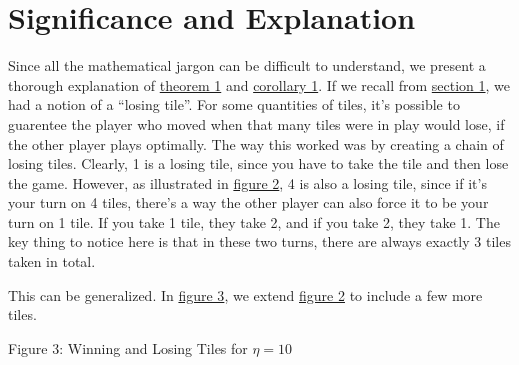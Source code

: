 \documentclass[11pt, letterpaper]{article}
\begin{document}
\section{Significance and Explanation}
\label{sec:3}
Since all the mathematical jargon can be difficult to understand, we present a thorough explanation of \hyperref[lma:1]{theorem 1} and \hyperref[cor:1]{corollary 1}. If we recall from \hyperref[sec:1]{section 1}, we had a notion of a ``losing tile''. For some quantities of tiles, it's possible to guarentee the player who moved when that many tiles were in play would lose, if the other player plays optimally. The way this worked was by creating a chain of losing tiles. Clearly, 1 is a losing tile, since you have to take the tile and then lose the game. However, as illustrated in \hyperref[fig:2]{figure 2}, 4 is also a losing tile, since if it's your turn on 4 tiles, there's a way the other player can also force it to be your turn on 1 tile. If you take 1 tile, they take 2, and if you take 2, they take 1. The key thing to notice here is that in these two turns, there are always exactly 3 tiles taken in total.

This can be generalized. In \hyperref[fig:3]{figure 3}, we extend \hyperref[fig:2]{figure 2} to include a few more tiles.

\begin{center}
    
    \noindent Figure 3: Winning and Losing Tiles for $\eta =10$\label{fig:3}
\end{center}
\end{document}
